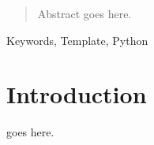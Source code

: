 \documentclass[lettersize,journal]{IEEEtran}
\begin{document}

\maketitle

\begin{abstract}
Abstract goes here.
\end{abstract}

\begin{IEEEkeywords}
Keywords, Template, Python
\end{IEEEkeywords}

\section{Introduction}

 goes here.


% 
% 







\vfill
\end{document}
